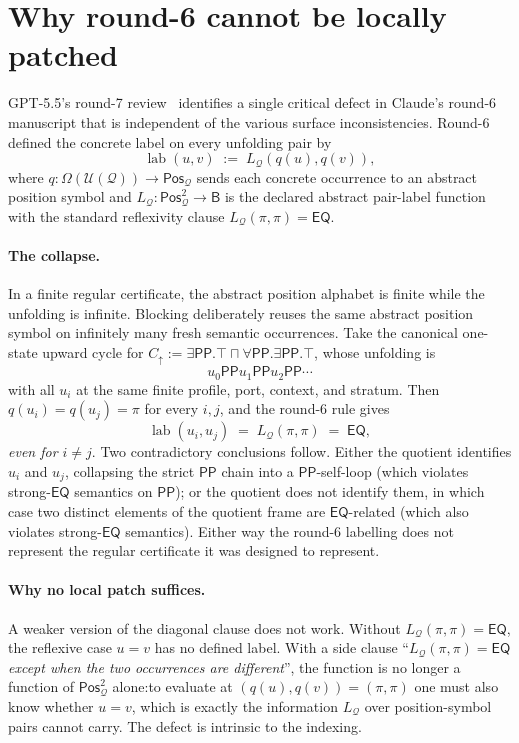 \documentclass[11pt]{article}
\theoremstyle{definition}
\theoremstyle{remark}
\newcommand{\PP}{\mathsf{PP}}
\newcommand{\EQ}{\mathsf{EQ}}
\newcommand{\Base}{\mathsf{B}}
\newcommand{\Q}{\mathcal Q}
\newcommand{\U}{\mathcal U}
\newcommand{\Pos}{\mathsf{Pos}}
\newcommand{\lab}{\operatorname{lab}}
\begin{document}
\tableofcontents
\bigskip

\section{Why round-6 cannot be locally patched}
\label{sec:round6-cannot-be-patched}

GPT-5.5's round-7 review~\cite{GPT55Round7Review} identifies a single
critical defect in Claude's round-6 manuscript that is independent of
the various surface inconsistencies.  Round-6 defined the concrete
label on every unfolding pair by
\[
  \lab(u,v)\;:=\;L_\Q(q(u),q(v)),
\]
where $q:\Omega(\U(\Q))\to\Pos_\Q$ sends each concrete occurrence to
an abstract position symbol and $L_\Q:\Pos_\Q^2\to\Base$ is the
declared abstract pair-label function with the standard reflexivity
clause $L_\Q(\pi,\pi)=\EQ$.

\paragraph{The collapse.}
In a finite regular certificate, the abstract position alphabet is
finite while the unfolding is infinite.  Blocking deliberately reuses
the same abstract position symbol on infinitely many fresh semantic
occurrences.  Take the canonical one-state upward cycle for
$C_\uparrow:=\exists\PP.\top\sqcap\forall\PP.\exists\PP.\top$, whose
unfolding is
\[
  u_0\PP u_1\PP u_2\PP\cdots
\]
with all $u_i$ at the same finite profile, port, context, and stratum.
Then $q(u_i)=q(u_j)=\pi$ for every $i,j$, and the round-6 rule gives
\[
  \lab(u_i,u_j)\;=\;L_\Q(\pi,\pi)\;=\;\EQ,
\]
\emph{even for $i\ne j$}.  Two contradictory conclusions follow.
Either the quotient identifies $u_i$ and $u_j$, collapsing the strict
$\PP$ chain into a $\PP$-self-loop (which violates strong-$\EQ$
semantics on $\PP$); or the quotient does not identify them, in which
case two distinct elements of the quotient frame are $\EQ$-related
(which also violates strong-$\EQ$ semantics).  Either way the round-6
labelling does not represent the regular certificate it was designed
to represent.

\paragraph{Why no local patch suffices.}
A weaker version of the diagonal clause does not work.  Without
$L_\Q(\pi,\pi)=\EQ$, the reflexive case $u=v$ has no defined label.
With a side clause ``$L_\Q(\pi,\pi)=\EQ$ \emph{except when the two
occurrences are different}'', the function is no longer a function of
$\Pos_\Q^2$ alone:\@ to evaluate at $(q(u),q(v))=(\pi,\pi)$ one must
also know whether $u=v$, which is exactly the information $L_\Q$ over
position-symbol pairs cannot carry.  The defect is intrinsic to the
indexing.
\end{document}
